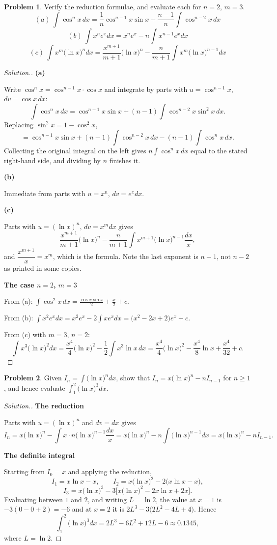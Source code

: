 \documentclass[11pt,a4paper]{article}
\theoremstyle{definition}
\newtheorem{problemx}{Problem}[subsection]
\newenvironment{problem}{\begin{problemx}}{\end{problemx}}
\newenvironment{solution}
  {\renewcommand{\qedsymbol}{}\begin{proof}[\textit{Solution}.]}
  {\end{proof}}
\newcommand{\subhead}[1]{%
  \par\medskip\noindent\textbf{#1}\par\nobreak\smallskip}
\begin{document}
\begin{problem}
Verify the reduction formulae, and evaluate each for $n=2$, $m=3$.
$$(a)\ \int\cos^nx\,dx = \frac1n\cos^{n-1}x\sin x + \frac{n-1}{n}\int\cos^{n-2}x\,dx$$
$$(b)\ \int x^ne^xdx = x^ne^x - n\int x^{n-1}e^xdx$$
$$(c)\ \int x^m\big(\ln x\big)^ndx = \frac{x^{m+1}}{m+1}\big(\ln x\big)^n
- \frac{n}{m+1}\int x^m\big(\ln x\big)^{n-1}dx$$
\end{problem}
\begin{solution}
\subhead{(a)}
Write $\cos^nx = \cos^{n-1}x\cdot\cos x$ and integrate by parts with
$u = \cos^{n-1}x$, $dv = \cos x\,dx$:
$$\int\cos^nx\,dx = \cos^{n-1}x\sin x + (n-1)\int\cos^{n-2}x\sin^2x\,dx .$$
Replacing $\sin^2x = 1-\cos^2x$,
$$= \cos^{n-1}x\sin x + (n-1)\int\cos^{n-2}x\,dx - (n-1)\int\cos^nx\,dx .$$
Collecting the original integral on the left gives $n\int\cos^nx\,dx$ equal to
the stated right-hand side, and dividing by $n$ finishes it.

\subhead{(b)}
Immediate from parts with $u = x^n$, $dv = e^xdx$.

\subhead{(c)}
Parts with $u = (\ln x)^n$, $dv = x^mdx$ gives
$$\frac{x^{m+1}}{m+1}\big(\ln x\big)^n
- \frac{n}{m+1}\int x^{m+1}\big(\ln x\big)^{n-1}\frac{dx}{x},$$
and $\dfrac{x^{m+1}}{x} = x^m$, which is the formula. Note the last exponent is
$n-1$, not $n-2$ as printed in some copies.

\subhead{The case $n=2$, $m=3$}
From (a): $\displaystyle\int\cos^2x\,dx = \frac{\cos x\sin x}{2} + \frac{x}{2} + c$.

From (b): $\displaystyle\int x^2e^xdx = x^2e^x - 2\int xe^xdx
= \big(x^2-2x+2\big)e^x + c$.

From (c) with $m=3$, $n=2$:
$$\int x^3\big(\ln x\big)^2dx = \frac{x^4}{4}\big(\ln x\big)^2
- \frac12\int x^3\ln x\,dx
= \frac{x^4}{4}\big(\ln x\big)^2 - \frac{x^4}{8}\ln x + \frac{x^4}{32} + c .$$
\end{solution}

\begin{problem}
Given $I_n = \displaystyle\int\big(\ln x\big)^ndx$, show that
$I_n = x\big(\ln x\big)^n - nI_{n-1}$ for $n\geq 1$, and hence evaluate
$\displaystyle\int_1^2\big(\ln x\big)^3dx$.
\end{problem}
\begin{solution}
\subhead{The reduction}
Parts with $u = (\ln x)^n$ and $dv = dx$ gives
$$I_n = x\big(\ln x\big)^n - \int x\cdot n\big(\ln x\big)^{n-1}\frac{dx}{x}
= x\big(\ln x\big)^n - n\int\big(\ln x\big)^{n-1}dx
= x\big(\ln x\big)^n - nI_{n-1} .$$

\subhead{The definite integral}
Starting from $I_0 = x$ and applying the reduction,
$$I_1 = x\ln x - x,\qquad
I_2 = x\big(\ln x\big)^2 - 2\big(x\ln x - x\big),$$
$$I_3 = x\big(\ln x\big)^3 - 3\Big[x\big(\ln x\big)^2 - 2x\ln x + 2x\Big].$$
Evaluating between $1$ and $2$, and writing $L = \ln 2$, the value at $x=1$ is
$-3(0-0+2) = -6$ and at $x=2$ it is $2L^3 - 3\big(2L^2 - 4L + 4\big)$. Hence
$$\int_1^2\big(\ln x\big)^3dx = 2L^3 - 6L^2 + 12L - 6 \approx 0.1345 ,$$
where $L = \ln 2$.
\end{solution}
\end{document}

